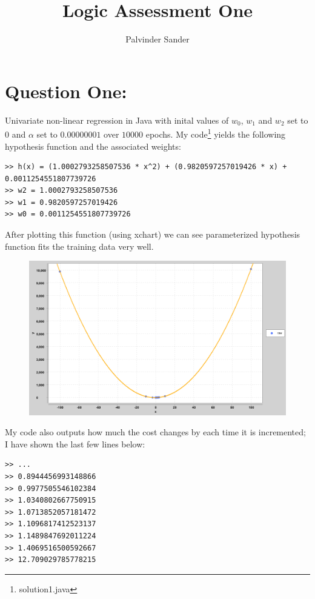 \documentclass[a4paper]{article}
\title{Logic Assessment One}
\author{Palvinder Sander}
\date{}
\begin{document}
\section*{Question One:}


Univariate non-linear regression in Java with inital values of $w_{0}$, $w_{1}$ and $w_{2}$ set to $0$ and $\alpha$ set to $0.00000001$ over $10000$ epochs. My code\footnote{solution1.java} yields the following hypothesis function and the associated weights:

\begin{verbatim}
>> h(x) = (1.0002793258507536 * x^2) + (0.9820597257019426 * x) + 0.0011254551807739726
>> w2 = 1.0002793258507536
>> w1 = 0.9820597257019426
>> w0 = 0.0011254551807739726
\end{verbatim}

\noindent After plotting this function (using xchart) we can see parameterized hypothesis function fits the training data very well.

\begin{figure}[h]
\includegraphics[scale=.4]{g1.png}
\centering
\end{figure}

\noindent My code also outputs how much the cost changes by each time it is incremented; I have shown the last few lines below:

\begin{verbatim}
>> ...
>> 0.8944456993148866
>> 0.9977505546102384
>> 1.0340802667750915
>> 1.0713852057181472
>> 1.1096817412523137
>> 1.1489847692011224
>> 1.4069516500592667
>> 12.709029785778215
\end{verbatim}
\end{document}
